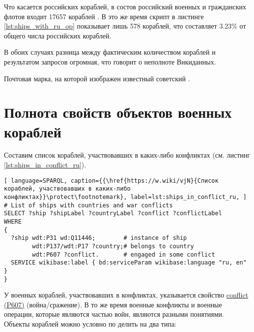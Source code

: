 Что касается российских кораблей, в состов российский военных и гражданских флотов входит \num{17657} кораблей \cite{RussianShips}. В это же время скрипт в листинге \ref{lst:ships_with_ru_op} показывает лишь 578 кораблей, что составляет 3.23\% от общего числа российских кораблей. 

В обоих случаях разница между фактическим количеством кораблей и результатом запросов огромная, что говорит о неполноте Викиданных.


\label{question:ship_2}

\begin{marginfigure}[0.0cm]
  {
    \setlength{\fboxsep}{0pt}%
    \setlength{\fboxrule}{1pt}%
  }
  \caption[Известный советский миноносец.]{Почтовая марка, на которой изображен известный советский  .}%
  \label{fig:grem_question}%
\end{marginfigure}

\section{Полнота свойств объектов военных кораблей}

Составим список кораблей, участвовавших в каких-либо конфликтах (см. листинг \ref{lst:ships_in_conflict_ru}).

\begin{lstlisting}[ language=SPARQL, caption={{\href{https://w.wiki/vjN}{Список кораблей, участвовавших в каких-либо конфликтах}}\protect\footnotemark}, label=lst:ships_in_conflict_ru, ]
# List of ships with countries and war conflicts
SELECT ?ship ?shipLabel ?countryLabel ?conflict ?conflictLabel
WHERE
{
  ?ship wdt:P31 wd:Q11446;        # instance of ship
        wdt:P137/wdt:P17 ?country;# belongs to country
        wdt:P607 ?conflict.       # engaged in some conflict
  SERVICE wikibase:label { bd:serviceParam wikibase:language "ru, en" }
}
\end{lstlisting}

У военных кораблей, участвовавших в конфликтах, указывается свойство \href{https://www.wikidata.org/wiki/Property:P607}{conflict (P607)} (война/сражение). В то же время военные конфликты и военные операции, которые являются частью войн, являются разными понятиями. Объекты кораблей можно условно по делить на два типа:

